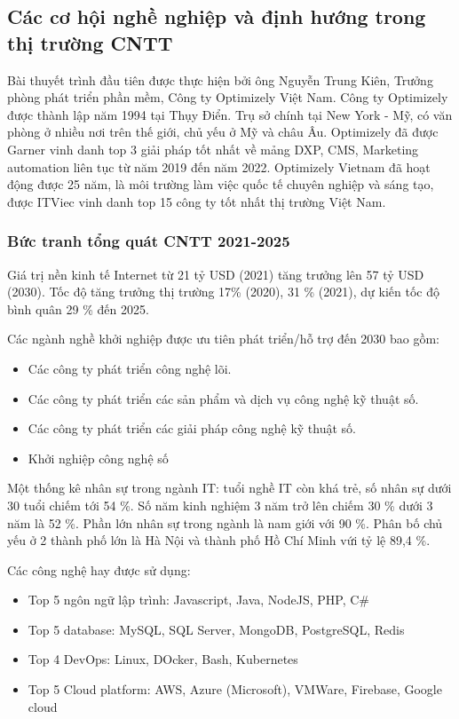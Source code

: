 \documentclass[14pt, a4paper]{article}
\numberwithin{equation}{section}
\numberwithin{figure}{section}
\numberwithin{dl}{section}
\numberwithin{md}{section}
\numberwithin{bd}{section}
\numberwithin{dn}{section}
\numberwithin{hq}{section}
\begin{document}
    \subsection{Các cơ hội nghề nghiệp và định hướng trong thị trường CNTT}

    Bài thuyết trình đầu tiên được thực hiện bởi ông Nguyễn Trung Kiên, Trưởng phòng phát triển phần mềm, Công ty Optimizely Việt Nam.
    Công ty Optimizely được thành lập năm 1994 tại Thụy Điển. Trụ sở chính tại New York - Mỹ, có văn phòng ở nhiều nơi trên thế giới, chủ yếu ở Mỹ và châu Âu.
    Optimizely đã được Garner vinh danh top 3 giải pháp tốt nhất về mảng DXP, CMS, Marketing automation liên tục từ năm 2019 đến năm 2022.
    Optimizely Vietnam đã hoạt động được 25 năm, là môi trường làm việc quốc tế chuyên nghiệp và sáng tạo, được ITViec vinh danh top 15 công ty tốt nhất thị trường Việt Nam.

    \subsubsection{Bức tranh tổng quát CNTT 2021-2025}

    Giá trị nền kinh tế Internet từ 21 tỷ USD (2021) tăng trưởng lên 57 tỷ USD (2030).
    Tốc độ tăng trưởng thị trường 17\% (2020), 31 \% (2021), dự kiến tốc độ bình quân 29 \% đến 2025.

    Các ngành nghề khởi nghiệp được ưu tiên phát triển/hỗ trợ đến 2030 bao gồm:

    
    \begin{itemize}
        \item Các công ty phát triển công nghệ lõi.
        \item Các công ty phát triển các sản phẩm và dịch vụ công nghệ kỹ thuật số.
        \item Các công ty phát triển các giải pháp công nghệ kỹ thuật số.
        \item Khởi nghiệp công nghệ số
    \end{itemize}

    Một thống kê nhân sự trong ngành IT: tuổi nghề IT còn khá trẻ, số nhân sự dưới 30 tuổi chiếm tới 54 \%.
    Số năm kinh nghiệm 3 năm trở lên chiếm 30 \% dưới 3 năm là 52 \%.
    Phần lớn nhân sự trong ngành là nam giới với 90 \%.
    Phân bố chủ yếu ở 2 thành phố lớn là Hà Nội và thành phố Hồ Chí Minh vứi tỷ lệ 89,4 \%.

    Các công nghệ hay được sử dụng:

    \begin{itemize}
        \item Top 5 ngôn ngữ lập trình: Javascript, Java, NodeJS, PHP, C\#
        \item Top 5 database: MySQL, SQL Server, MongoDB, PostgreSQL, Redis
        \item Top 4 DevOps: Linux, DOcker, Bash, Kubernetes
        \item Top 5 Cloud platform: AWS, Azure (Microsoft), VMWare, Firebase, Google cloud
    \end{itemize}
\end{document}
